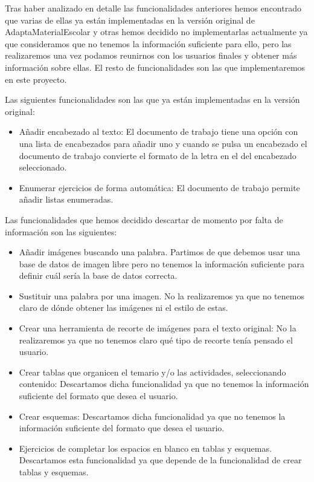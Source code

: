 Tras haber analizado en detalle las funcionalidades anteriores hemos encontrado que varias de ellas ya están implementadas en la versión original de AdaptaMaterialEscolar y otras hemos decidido no implementarlas actualmente ya que consideramos que no tenemos la información suficiente para ello, pero las realizaremos una vez podamos reunirnos con los usuarios finales y obtener más información sobre ellas. El resto de funcionalidades son las que implementaremos en este proyecto.

Las siguientes funcionalidades son las que ya están implementadas en la versión original:
\begin{itemize}
  \item Añadir encabezado al texto: El documento de trabajo tiene una opción con una lista de encabezados para añadir uno y cuando se pulsa un encabezado el documento de trabajo convierte el formato de la letra en el del encabezado seleccionado.
  \item Enumerar ejercicios de forma automática: El documento de trabajo permite añadir listas enumeradas.
\end{itemize}

Las funcionalidades que hemos decidido descartar de momento por falta de información son las siguientes:
\begin{itemize}
  \item Añadir imágenes buscando una palabra. Partimos de que debemos usar una base de datos de imagen libre pero no tenemos la información suficiente para definir cuál sería la base de datos correcta.
  \item Sustituir una palabra por una imagen. No la realizaremos ya que no tenemos claro de dónde obtener las imágenes ni el estilo de estas.
  \item Crear una herramienta de recorte de imágenes para el texto original: No la realizaremos ya que no tenemos claro qué tipo de recorte tenía pensado el usuario.
  \item Crear tablas que organicen el temario y/o las actividades, seleccionando contenido: Descartamos dicha funcionalidad ya que no tenemos la información suficiente del formato que desea el usuario.
  \item Crear esquemas: Descartamos dicha funcionalidad ya que no tenemos la información suficiente del formato que desea el usuario.
  \item Ejercicios de completar los espacios en blanco en tablas y esquemas. Descartamos esta funcionalidad ya que depende de la funcionalidad de crear tablas y esquemas.
\end{itemize}

